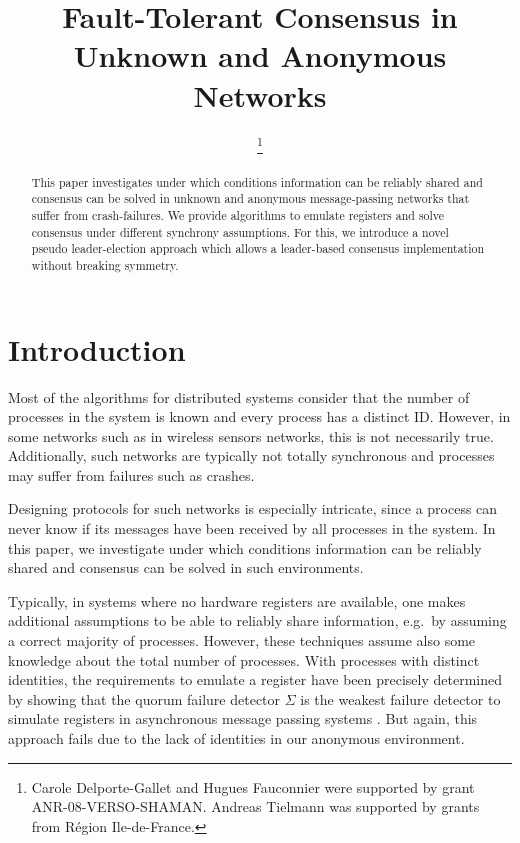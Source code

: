 \documentclass[conference, compsoc]{IEEEtran}
\begin{document}
\title{Fault-Tolerant Consensus in Unknown and Anonymous Networks}



\IEEEoverridecommandlockouts

\author{
	\thanks{Carole Delporte-Gallet and Hugues Fauconnier were supported by grant ANR-08-VERSO-SHAMAN. Andreas Tielmann was supported by grants from R\'egion Ile-de-France.}
}



\maketitle


\begin{abstract}
This paper investigates under which conditions information can be reliably shared and consensus can be solved in unknown and anonymous message-passing networks that suffer from crash-failures.  We provide algorithms to emulate registers and solve consensus under different synchrony assumptions. For this, we introduce a novel pseudo leader-election approach which allows a leader-based consensus implementation without breaking symmetry. 

\end{abstract}



\section{Introduction}

Most of the algorithms for distributed systems consider that the number of processes in the system is known and every process has a distinct ID. However, in some networks such as in wireless sensors networks, this is not necessarily true. Additionally, such networks are typically not totally synchronous and processes may suffer from failures such as crashes.

Designing protocols for such networks is especially intricate, since a process can never know if its messages have been received by all processes in the system. In this paper, we investigate under which conditions information can be reliably shared and consensus can be solved in such environments.   

Typically, in systems where no hardware registers are available, one makes additional assumptions to be able to reliably share information, e.g.~by assuming a correct majority of processes. However, these techniques assume also some knowledge about the total number of processes. With processes with distinct identities, the requirements to emulate a register have been precisely determined by showing that the quorum failure detector $\Sigma$ is the weakest failure detector to simulate registers in asynchronous message passing systems \cite{200377/IC}. But again, this approach fails due to the lack of identities in our anonymous environment.
\end{document}
